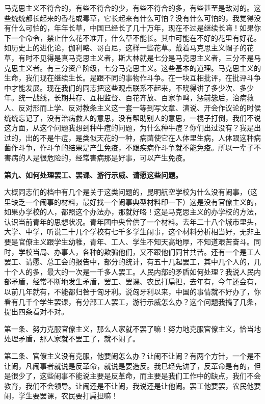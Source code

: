 马克思主义不符合的，有些不符合的少，有些不符合的多，有些甚至是敌对的。这些统统都长起来的香花或毒草，它长起来有什么可怕？没有什么可怕的，我觉得没有什么可怕的，年年长草，中国已经长了几十万年，现在不过是继续长嘛！如果你下一个命令，禁止什么花不准开，什么草不能长。其中可能在不好的花里有好花。如历史上的进化论，伽利略、哥白尼，这样一些花草。戴着马克思主义帽子的花草，有时不见得是真马克思主义者，斯大林就是七分是马克思主义者，三分不是马克思主义者。有三分资产阶级，七分马克思主义。这些基本的道理。马克思主义的生命，我们现在继续生长。是跟不同的事物作斗争。在一块互相批评，在批评斗争中才能发展。现在我们的同志把这些观点联系不起来，不晓得讲了多少次、多少年。统一战线，长期共存、互相监督、百花齐放、百家争鸣，惩前毖后，治病救人、反对形而上学、反对教条主义这一套一等到写文章、演说、开会作议论的时侯统统忘记了，没有治病救人的意思，没有帮助别人的意思，一棍子打倒，我们不说这方面，从这个问题我想到种牛痘的问题，为什么种牛痘？你们出过没有？我是出过的，出的不是牛痘，是类似天花的一种，病菌使它在人体里生病，人体跟这种病菌作斗争，作斗争的结果是产生免疫，不跟疾病作斗争就不能免疫。所以一辈子不害病的人是很危险的，经常害病那是好事，可以产生免疫。

\textbf{第九、如何处理罢工、罢课、游行示威、请愿这些问题。}

大概同志们的档中有几个是关于这类问题的，昆明航空学校为什么没有闹事，（这里缺乏一个闹事的材料，最好找一个闹事典型材料印一下）这是没有官僚主义的，如果办学校的人，都照这个办法办，那就好咯！这是马克思主义的办学校的方法，认识当前青年的思想状况。青年团中央曾供了一个材料。去年二十八个城市里头，大学、中学，听说二十几个学校有七千多学生闹事，这个材料分析相当好，无非主要是官僚主义跟学生幼稚，青年、工人、学生不知天高地厚，不知道艰苦奋斗。同时，学校当局、办事人，各种的欺骗他们，又不跟他们同甘共苦。还有一个是工人罢工、请愿、总工会的报告中，部分的统计，有五十几起罢工，其中几个人的，几十个人的多，最大的一次是一千多人罢工。人民内部的矛盾如何处理？我说人民内部矛盾，经常不断地发生矛盾，罢工、罢课、农民打扁担，去年有，今年还会有，以前几年就有，不能都归咎于匈牙利。说匈牙利以来，中国的事情就不好办了，你看有几千个学生罢课，有分部工人罢工，游行示威怎么办？这个问题我搞了几条，提出四条看对不对。

第一条、努力克服官僚主义，那么人家就不罢了嘛！努力地克服官僚主义，恰当地处理矛盾，那人家就不罢工了，就不闹了。

第二条、官僚主义没有克服，他要闹怎么办？让闹不让闹？有两个方针，一个是不让闹，凡闹事者就说是反革命，就说是要造反。我巳经先讲了，反革命是有的，但是很少了，这些闹事不能说主要是反革命，而主要是我们工作中的缺点，我们不会教育，我们不会领导。让闹还是不让闹，我说还是让他闹。罢工他要罢，农民他要闹，学生要罢课，农民要打扁担嘛！

